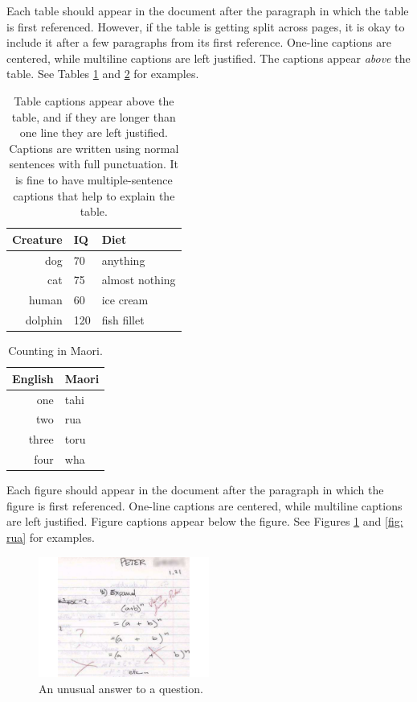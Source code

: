 \documentclass{wscpaperproc}
\theoremstyle{wsc}
\begin{document}
Each table should appear in the document after the paragraph in which the table is first referenced. However, if the table is getting split across pages, it is okay to include it after a few paragraphs from its first reference.
One-line captions are centered, while multiline captions are left justified.
The captions appear {\em above} the table. See Tables \ref{tab: first} and \ref{tab: second} for examples.

\begin{table}[htb]
\centering
\caption{Table captions appear above the table, and if they are longer than one line they are left justified. Captions are written using normal sentences with full punctuation. It is fine to have multiple-sentence captions that help to explain the table.\label{tab: first}}
\begin{tabular}{rll}
\hline
Creature & IQ & Diet\\ \hline
dog & 70 & anything\\
cat & 75 & almost nothing\\
human & 60 & ice cream \\
dolphin & 120 & fish fillet\\
\hline
\end{tabular}
\end{table}

\begin{table}[htb]
\centering
\caption{Counting in Maori.\label{tab: second}}
\begin{tabular}{r|l}
English & Maori \\ \hline
one & tahi \\
two & rua \\
three & toru \\
four & wha \\
\end{tabular}
\end{table}

Each figure should appear in the document after the paragraph in which the figure is first referenced. One-line captions are centered,
while multiline captions are left justified. Figure captions appear below the figure. See Figures \ref{fig: tahi} and \ref{fig: rua} for examples.

\begin{figure}[htb]
{
\centering
\includegraphics[width=0.50\textwidth]{MathExpandExpression}
\caption{An unusual answer to a question.\label{fig: tahi}}
}
\end{figure}
\end{document}
